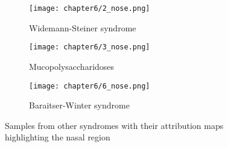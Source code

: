 \documentclass[../report.tex]{subfiles}
\begin{document}
		\begin{figure}[H]
		\centering			
		\begin{subfigure}[t]{1\textwidth}
			\centering
			\texttt{[image: chapter6/2\_nose.png]}
			\caption{Widemann-Steiner syndrome}	
		\end{subfigure}
		\begin{subfigure}[t]{1\textwidth}
			\centering
			\texttt{[image: chapter6/3\_nose.png]}
			\caption{Mucopolysaccharidoses}
		\end{subfigure}
		\begin{subfigure}[t]{1\textwidth}
			\centering
			\texttt{[image: chapter6/6\_nose.png]}
			\caption{Baraitser-Winter syndrome}
		\end{subfigure}
		\caption{Samples from other syndromes with their attribution maps highlighting the nasal region}
		\label{fig_nose_region}
		\end{figure}
\end{document}
